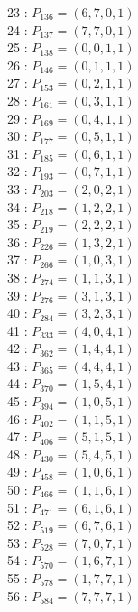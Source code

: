 \documentclass{article}
\begin{document}
{\begin{multicols}{3}
23 : $P_{136}=( 6, 7, 0, 1 )$\\
24 : $P_{137}=( 7, 7, 0, 1 )$\\
25 : $P_{138}=( 0, 0, 1, 1 )$\\
26 : $P_{146}=( 0, 1, 1, 1 )$\\
27 : $P_{153}=( 0, 2, 1, 1 )$\\
28 : $P_{161}=( 0, 3, 1, 1 )$\\
29 : $P_{169}=( 0, 4, 1, 1 )$\\
30 : $P_{177}=( 0, 5, 1, 1 )$\\
31 : $P_{185}=( 0, 6, 1, 1 )$\\
32 : $P_{193}=( 0, 7, 1, 1 )$\\
33 : $P_{203}=( 2, 0, 2, 1 )$\\
34 : $P_{218}=( 1, 2, 2, 1 )$\\
35 : $P_{219}=( 2, 2, 2, 1 )$\\
36 : $P_{226}=( 1, 3, 2, 1 )$\\
37 : $P_{266}=( 1, 0, 3, 1 )$\\
38 : $P_{274}=( 1, 1, 3, 1 )$\\
39 : $P_{276}=( 3, 1, 3, 1 )$\\
40 : $P_{284}=( 3, 2, 3, 1 )$\\
41 : $P_{333}=( 4, 0, 4, 1 )$\\
42 : $P_{362}=( 1, 4, 4, 1 )$\\
43 : $P_{365}=( 4, 4, 4, 1 )$\\
44 : $P_{370}=( 1, 5, 4, 1 )$\\
45 : $P_{394}=( 1, 0, 5, 1 )$\\
46 : $P_{402}=( 1, 1, 5, 1 )$\\
47 : $P_{406}=( 5, 1, 5, 1 )$\\
48 : $P_{430}=( 5, 4, 5, 1 )$\\
49 : $P_{458}=( 1, 0, 6, 1 )$\\
50 : $P_{466}=( 1, 1, 6, 1 )$\\
51 : $P_{471}=( 6, 1, 6, 1 )$\\
52 : $P_{519}=( 6, 7, 6, 1 )$\\
53 : $P_{528}=( 7, 0, 7, 1 )$\\
54 : $P_{570}=( 1, 6, 7, 1 )$\\
55 : $P_{578}=( 1, 7, 7, 1 )$\\
56 : $P_{584}=( 7, 7, 7, 1 )$\\
\end{multicols}


%


%


}%
\end{document}
